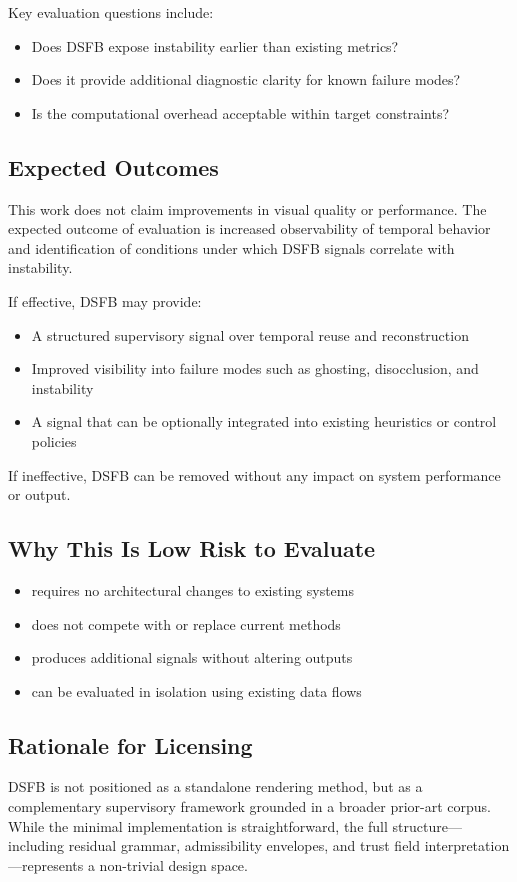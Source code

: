 \documentclass[11pt,letterpaper]{article}
\theoremstyle{gcresult}
\theoremstyle{definition}
\begin{document}
Key evaluation questions include:
\begin{itemize}
    \item Does DSFB expose instability earlier than existing metrics?
    \item Does it provide additional diagnostic clarity for known failure modes?
    \item Is the computational overhead acceptable within target constraints?
\end{itemize}

\subsection{Expected Outcomes}
This work does not claim improvements in visual quality or performance. The expected outcome of evaluation is increased observability of temporal behavior and identification of conditions under which DSFB signals correlate with instability.

If effective, DSFB may provide:
\begin{itemize}
    \item A structured supervisory signal over temporal reuse and reconstruction
    \item Improved visibility into failure modes such as ghosting, disocclusion, and instability
    \item A signal that can be optionally integrated into existing heuristics or control policies
\end{itemize}

If ineffective, DSFB can be removed without any impact on system performance or output.

\subsection{Why This Is Low Risk to Evaluate}
\begin{itemize}
    \item requires no architectural changes to existing systems
    \item does not compete with or replace current methods
    \item produces additional signals without altering outputs
    \item can be evaluated in isolation using existing data flows
\end{itemize}

\subsection{Rationale for Licensing}
DSFB is not positioned as a standalone rendering method, but as a complementary supervisory framework grounded in a broader prior-art corpus. While the minimal implementation is straightforward, the full structure—including residual grammar, admissibility envelopes, and trust field interpretation—represents a non-trivial design space.
\end{document}
